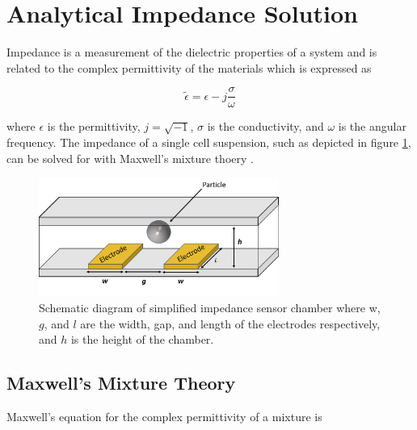 
\section{Analytical Impedance Solution} \label{sec: analytical_impedance_solution}

\par Impedance is a measurement of the dielectric properties of a system and is related to the complex permittivity of the materials which is expressed as

\begin{equation}
    \tilde{\epsilon} = \epsilon - j\frac{\sigma}{\omega}
\end{equation}

\noindent where $\epsilon$ is the permittivity, $j = \sqrt{-1}$, $\sigma$ is the conductivity, and $\omega$ is the angular frequency. The impedance of a single cell suspension, such as depicted in figure \ref{fig:simplified_IS}, can be solved for with Maxwell's mixture thoery \cite{james_clerk_maxwell_treatise_1892, sun_single-cell_2010}.

\begin{figure}[ht]
 \centering
 \includegraphics[width=0.7\textwidth]{images/cellAndElectrodes.png}
 \caption[Schematic diagram of simplified impedance sensor chamber.]{Schematic diagram of simplified impedance sensor chamber where w, $g$, and $l$ are the width, gap, and length of the electrodes respectively, and $h$ is the height of the chamber.}
 \label{fig:simplified_IS}
 \end{figure}
 
 

\subsection{Maxwell's Mixture Theory}
 
 Maxwell's equation for the complex permittivity of a mixture is
  
